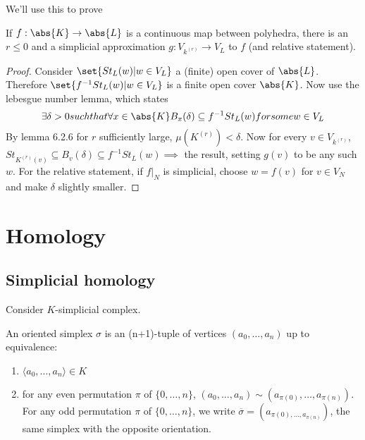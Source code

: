 \documentclass{article}
\numberwithin{nthm}{subsection}
\begin{document}
We'll use this to prove
\begin{thm}
    If $f: \abs{K} \to \abs{L}$ is a continuous map between polyhedra, there is an $r \leq 0$ and a simplicial approximation $g: V_{k^{(r)}} \to V_L$ to $f$ (and relative statement).
\end{thm}

\begin{proof}
    Consider $\set{St_L(w) | w \in V_L}$ a (finite) open cover of $\abs{L}$.
    Therefore $\set{f^{-1} St_L(w) | w \in V_L}$ is a finite open cover $\abs{K}$.
    Now use the lebesgue number lemma, which states
    \begin{equation*}
        \exists \delta > 0 such that \forall x \in \abs{K} B_x(\delta) \subseteq f^{-1} St_L(w) for some w \in V_L
    \end{equation*}
    By lemma 6.2.6 for $r$ sufficiently large, $\mu(K^{(r)}) < \delta$.
    Now for every $v \in V_{k^{(r)}}$, $St_{K^{(r)}(v)} \subseteq B_v(\delta) \subseteq f^{-1} St_L(w) \implies$ the result, setting $g(v)$ to be any such $w$.
    For the relative statement, if $f|_N$ is simplicial, choose $w = f(v)$ for $v \in V_N$ and make $\delta$ slightly smaller.
\end{proof}

\section{Homology}
\subsection{Simplicial homology}
Consider $K$-simplicial complex.

\begin{defi}
    An oriented simplex $\sigma$ is an (n+1)-tuple of vertices $(a_0, \dotsc, a_n)$ up to equivalence:
    \begin{enumerate}[label=(\roman*)]
        \item $\langle a_0, \dotsc, a_n \rangle \in K$
        \item for any even permutation $\pi$ of $\{0, \dotsc, n\}$, $(a_0, \dotsc, a_n) \sim (a_{\pi(0)}, \dotsc, a_{\pi(n)})$.
            For any odd permutation $\pi$ of $\{0, \dotsc, n\}$, we write
            $\overline{\sigma} = (a_{\pi(0), \dotsc, a_{\pi(n)}})$, the same simplex with the opposite orientation.
    \end{enumerate}
\end{defi}
\end{document}
